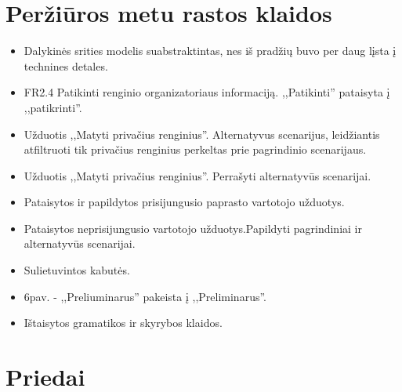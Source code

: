 \documentclass{VUMIFPSkursinis}
\begin{document}
		
    \section{Peržiūros metu rastos klaidos}
		\begin{itemize}
			\item Dalykinės srities modelis suabstraktintas, nes iš pradžių buvo per daug lįsta į technines detales.
			\item FR2.4 Patikinti renginio organizatoriaus informaciją. ,,Patikinti'' pataisyta į ,,patikrinti''.
			\item Užduotis ,,Matyti privačius renginius''. Alternatyvus scenarijus, leidžiantis atfiltruoti tik privačius renginius perkeltas prie pagrindinio scenarijaus.
			\item Užduotis ,,Matyti privačius renginius''. Perrašyti alternatyvūs scenarijai.
			\item Pataisytos ir papildytos prisijungusio paprasto vartotojo užduotys.
			\item Pataisytos neprisijungusio vartotojo užduotys.Papildyti pagrindiniai ir alternatyvūs scenarijai.
			\item Sulietuvintos kabutės.
			\item 6pav. - ,,Preliuminarus'' pakeista į ,,Preliminarus''.
			\item Ištaisytos gramatikos ir skyrybos klaidos.
		\end{itemize}
		
    \section{Priedai}\label{priedai}
\end{document}
